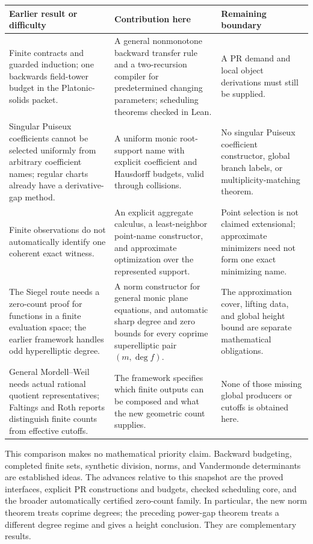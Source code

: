 \begin{longtable}{@{}p{}p{}p{}@{}}
\toprule
Earlier result or difficulty & Contribution here & Remaining boundary\\
\midrule
\endhead
Finite contracts and guarded induction; one backwards field-tower
budget in the Platonic-solids packet. & A general nonmonotone backward
transfer rule and a two-recursion compiler for predetermined changing
parameters; scheduling theorems checked in Lean. & A PR demand and
local object derivations must still be supplied.\\[4pt]
Singular Puiseux coefficients cannot be selected uniformly from arbitrary
coefficient names; regular charts already have a derivative-gap method.
& A uniform monic root-support name with explicit coefficient and
Hausdorff budgets, valid through collisions. & No singular Puiseux
coefficient constructor, global branch labels, or multiplicity-matching
theorem.\\[4pt]
Finite observations do not automatically identify one coherent exact
witness. & An explicit aggregate calculus, a least-neighbor point-name
constructor, and approximate optimization over the represented support.
& Point selection is not claimed extensional; approximate minimizers
need not form one exact minimizing name.\\[4pt]
The Siegel route needs a zero-count proof for functions in a finite
evaluation space; the earlier framework handles odd hyperelliptic degree.
& A norm constructor for general monic plane equations, and automatic
sharp degree and zero bounds for every coprime superelliptic pair
$(m,\deg f)$. & The approximation cover, lifting data, and global height
bound are separate mathematical obligations.\\[4pt]
General Mordell--Weil needs actual rational quotient representatives;
Faltings and Roth reports distinguish finite counts from effective
cutoffs. & The framework specifies which finite outputs can be composed
and what the new geometric count supplies. & None of those missing
global producers or cutoffs is obtained here.\\
\bottomrule
\end{longtable}

This comparison makes no mathematical priority claim. Backward budgeting,
completed finite sets, synthetic division, norms, and Vandermonde
determinants are established ideas. The advances relative to this
snapshot are the proved interfaces, explicit PR constructions and
budgets, checked scheduling core, and the broader automatically certified
zero-count family. In particular, the new norm theorem treats coprime
degrees; the preceding power-gap theorem treats a different degree
regime and gives a height conclusion. They are complementary results.

